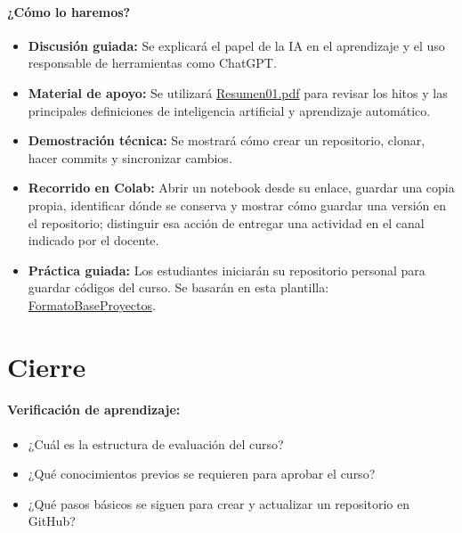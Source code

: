 \documentclass[a4,11pt]{aleph-notas}
\begin{document}
\paragraph{¿Cómo lo haremos?}
\begin{itemize}[leftmargin=*]
    \item \textbf{Discusión guiada:} Se explicará el papel de la IA en el aprendizaje y el uso responsable de herramientas como ChatGPT.
    \item \textbf{Material de apoyo:} Se utilizará \href{https://andres-merino.github.io/AprendizajeAutomaticoInicial-05-N0105/2-Resumenes/Resumen01.pdf}{Resumen01.pdf} para revisar los hitos y las principales definiciones de inteligencia artificial y aprendizaje automático.
    \item \textbf{Demostración técnica:} Se mostrará cómo crear un repositorio, clonar, hacer commits y sincronizar cambios.
    \item \textbf{Recorrido en Colab:} Abrir un notebook desde su enlace, guardar una copia propia, identificar dónde se conserva y mostrar cómo guardar una versión en el repositorio; distinguir esa acción de entregar una actividad en el canal indicado por el docente.
    \item \textbf{Práctica guiada:} Los estudiantes iniciarán su repositorio personal para guardar códigos del curso. Se basarán en esta plantilla: \href{https://github.com/andres-merino/FormatoBaseProyectos}{FormatoBaseProyectos}.
\end{itemize}

\section*{Cierre}

\paragraph{Verificación de aprendizaje:}
\begin{itemize}[leftmargin=*]
    \item ¿Cuál es la estructura de evaluación del curso?
    \item ¿Qué conocimientos previos se requieren para aprobar el curso?
    \item ¿Qué pasos básicos se siguen para crear y actualizar un repositorio en GitHub?
\end{itemize}
\end{document}

